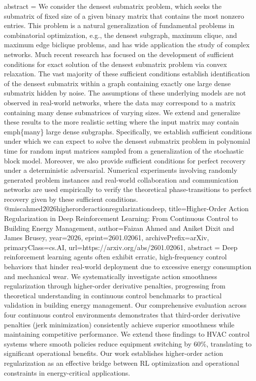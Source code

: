 {      abstract = {We consider the densest submatrix problem, which seeks the submatrix of fixed size of a given binary matrix that contains the most nonzero entries. This problem is a natural generalization of fundamental problems in combinatorial optimization, e.g., the densest subgraph, maximum clique, and maximum edge biclique problems, and has wide application the study of complex networks. Much recent research has focused on the development of sufficient conditions for exact solution of the densest submatrix problem via convex relaxation. The vast majority of these sufficient conditions establish identification of the densest submatrix within a graph containing exactly one large dense submatrix hidden by noise. The assumptions of these underlying models are not observed in real-world networks, where the data may correspond to a matrix containing many dense submatrices of varying sizes.   We extend and generalize these results to the more realistic setting where the input matrix may contain \\emph\{many\} large dense subgraphs. Specifically, we establish sufficient conditions under which we can expect to solve the densest submatrix problem in polynomial time for random input matrices sampled from a generalization of the stochastic block model. Moreover, we also provide sufficient conditions for perfect recovery under a deterministic adversarial. Numerical experiments involving randomly generated problem instances and real-world collaboration and communication networks are used empirically to verify the theoretical phase-transitions to perfect recovery given by these sufficient conditions.}
}@misc{ahmed2026higherorderactionregularizationdeep,
      title={Higher-Order Action Regularization in Deep Reinforcement Learning: From Continuous Control to Building Energy Management}, 
      author={Faizan Ahmed and Aniket Dixit and James Brusey},
      year={2026},
      eprint={2601.02061},
      archivePrefix={arXiv},
      primaryClass={cs.AI},
      url={https://arxiv.org/abs/2601.02061},
      abstract = {Deep reinforcement learning agents often exhibit erratic, high-frequency control behaviors that hinder real-world deployment due to excessive energy consumption and mechanical wear. We systematically investigate action smoothness regularization through higher-order derivative penalties, progressing from theoretical understanding in continuous control benchmarks to practical validation in building energy management. Our comprehensive evaluation across four continuous control environments demonstrates that third-order derivative penalties (jerk minimization) consistently achieve superior smoothness while maintaining competitive performance. We extend these findings to HVAC control systems where smooth policies reduce equipment switching by 60\%, translating to significant operational benefits. Our work establishes higher-order action regularization as an effective bridge between RL optimization and operational constraints in energy-critical applications.}
}
